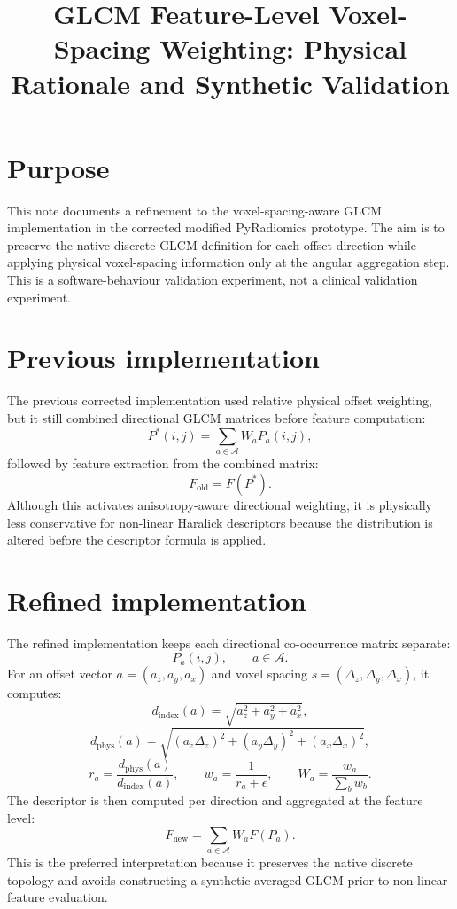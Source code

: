 \documentclass[11pt,a4paper]{article}
\title{GLCM Feature-Level Voxel-Spacing Weighting: Physical Rationale and Synthetic Validation}
\author{}
\date{}
\begin{document}
\maketitle

\section*{Purpose}
This note documents a refinement to the voxel-spacing-aware GLCM implementation in the corrected modified PyRadiomics prototype. The aim is to preserve the native discrete GLCM definition for each offset direction while applying physical voxel-spacing information only at the angular aggregation step. This is a software-behaviour validation experiment, not a clinical validation experiment.

\section*{Previous implementation}
The previous corrected implementation used relative physical offset weighting, but it still combined directional GLCM matrices before feature computation:
\[
  P^{*}(i,j) = \sum_{a \in \mathcal{A}} W_a P_a(i,j),
\]
followed by feature extraction from the combined matrix:
\[
  F_{\mathrm{old}} = F(P^{*}).
\]
Although this activates anisotropy-aware directional weighting, it is physically less conservative for non-linear Haralick descriptors because the distribution is altered before the descriptor formula is applied.

\section*{Refined implementation}
The refined implementation keeps each directional co-occurrence matrix separate:
\[
  P_a(i,j), \qquad a \in \mathcal{A}.
\]
For an offset vector \(a=(a_z,a_y,a_x)\) and voxel spacing \(s=(\Delta_z,\Delta_y,\Delta_x)\), it computes:
\[
  d_{\mathrm{index}}(a) = \sqrt{a_z^2+a_y^2+a_x^2},
\]
\[
  d_{\mathrm{phys}}(a) = \sqrt{(a_z\Delta_z)^2+(a_y\Delta_y)^2+(a_x\Delta_x)^2},
\]
\[
  r_a = \frac{d_{\mathrm{phys}}(a)}{d_{\mathrm{index}}(a)}, \qquad
  w_a = \frac{1}{r_a+\epsilon}, \qquad
  W_a = \frac{w_a}{\sum_b w_b}.
\]
The descriptor is then computed per direction and aggregated at the feature level:
\[
  F_{\mathrm{new}} = \sum_{a \in \mathcal{A}} W_a F(P_a).
\]
This is the preferred interpretation because it preserves the native discrete topology and avoids constructing a synthetic averaged GLCM prior to non-linear feature evaluation.
\end{document}

